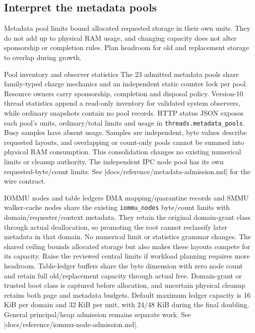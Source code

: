 \subsection{Interpret the metadata pools}

Metadata pool limits bound allocated requested storage in their own units.
They do not add up to physical RAM usage, and changing capacity does not alter
sponsorship or completion rules. Plan headroom for old and replacement storage
to overlap during growth.

\begin{implementationdetail}{Pool inventory and observer statistics}
The 23 admitted metadata pools share family-typed charge mechanics and an
independent static counter lock per pool. Resource owners carry sponsorship,
completion and disposal policy. Version-10 thread statistics append a read-only
inventory for validated system observers, while ordinary snapshots contain no pool
records. HTTP status JSON exposes each pool's units, ordinary/total limits and
usage in \texttt{threads.metadata\_pools}. Busy samples have absent usage.
Samples are independent, byte values describe requested layouts, and overlapping
or count-only pools cannot be summed into physical RAM consumption. This
consolidation changes no existing numerical limits or cleanup authority. The
independent IPC node pool has its own requested-byte/count limits. See
\repofile|docs/reference/metadata-admission.md| for the wire contract.
\end{implementationdetail}

\begin{implementationdetail}{IOMMU nodes and table ledgers}
DMA mapping/quarantine records and SMMU walker-cache nodes share the existing
\texttt{iommu\_nodes} byte/count limits with domain/requester/context metadata.
They retain the original domain-grant class through actual deallocation, so
promoting the root cannot reclassify later metadata in that domain. No numerical
limit or statistics grammar changes. The shared ceiling bounds allocated storage
but also makes these layouts compete for its capacity. Raise the reviewed
central limits if workload planning requires more headroom. Table-ledger buffers
share the byte dimension with zero node count and retain full old/replacement
capacity through actual free. Domain-grant or trusted boot class is captured
before allocation, and uncertain physical cleanup retains both page and metadata
budgets. Default maximum ledger capacity is 16 KiB per domain and 32 KiB per unit,
with 24/48 KiB during the final doubling. General principal/heap admission remains
separate work. See
\repofile|docs/reference/iommu-node-admission.md|.
\end{implementationdetail}

